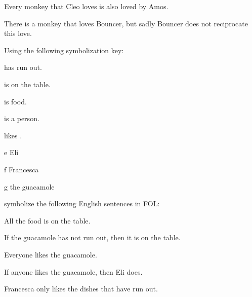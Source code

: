 \begin{practiceproblems}
\begin{problemslist}
		\item Every monkey that Cleo loves is also loved by Amos.
		\item[] 
		\item There is a monkey that loves Bouncer, but sadly Bouncer does not reciprocate this love.
		\item[] 
	\end{problemslist}
	
		\problempart
	Using the following symbolization key:
	\begin{ekey}
		\item[\atom{R}{x}]  has run out.
		\item[\atom{T}{x}]  is on the table.
		\item[\atom{F}{x}]  is food.
		\item[\atom{P}{x}]  is a person.
		\item[\atom{L}{x,y}]  likes .
		\item[e] Eli
		\item[f] Francesca
		\item[g] the guacamole
	\end{ekey}
	symbolize the following English sentences in FOL:
	\begin{problemslist}
		\item All the food is on the table.
		\item[] 
		\item If the guacamole has not run out, then it is on the table.
		\item[] 
		\item Everyone likes the guacamole.
		\item[] 
		\item If anyone likes the guacamole, then Eli does.
		\item[] \item Francesca only likes the dishes that have run out.

\end{problemslist}
\end{practiceproblems}
